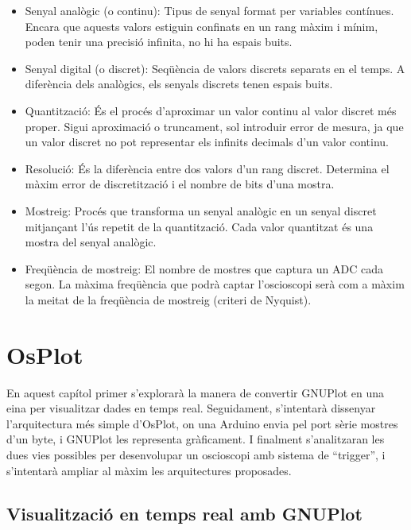 \documentclass{tfgitic}[2023/06/30]
\begin{document}
\begin{itemize}
	\item Senyal analògic (o continu): Tipus de senyal format per
          variables contínues. Encara que aquests valors estiguin
          confinats en un rang màxim i mínim, poden tenir una precisió
          infinita, no hi ha espais buits.
	\item Senyal digital (o discret): Seqüència de valors discrets
          separats en el temps. A diferència dels analògics, els
          senyals discrets tenen espais buits.
	\item Quantització: És el procés d'aproximar un valor continu
          al valor discret més proper. Sigui aproximació o truncament,
          sol introduir error de mesura, ja que un valor discret no
          pot representar els infinits decimals d'un valor continu.
	\item Resolució: És la diferència entre dos valors d'un rang
          discret. Determina el màxim error de discretització i el
          nombre de bits d'una mostra.
	\item Mostreig: Procés que transforma un senyal analògic en un
          senyal discret mitjançant l'ús repetit de la quantització.
          Cada valor quantitzat és una mostra del senyal analògic.
	\item Freqüència de mostreig: El nombre de mostres que captura
          un ADC cada segon. La màxima freqüència que podrà captar
          l'osci\lgem oscopi serà com a màxim la meitat de la
          freqüència de mostreig (criteri de Nyquist).
\end{itemize}

\chapter{OsPlot}

En aquest capítol primer s'explorarà la manera de convertir GNUPlot en
una eina per visualitzar dades en temps real. Seguidament, s'intentarà
dissenyar l'arquitectura més simple d'OsPlot, on una Arduino envia pel
port sèrie mostres d'un byte, i GNUPlot les representa gràficament.  I
finalment s'analitzaran les dues vies possibles per desenvolupar un
osci\lgem oscopi amb sistema de ``trigger'', i s'intentarà ampliar al
màxim les arquitectures proposades.

\section{Visualització en temps real amb GNUPlot}
\end{document}
